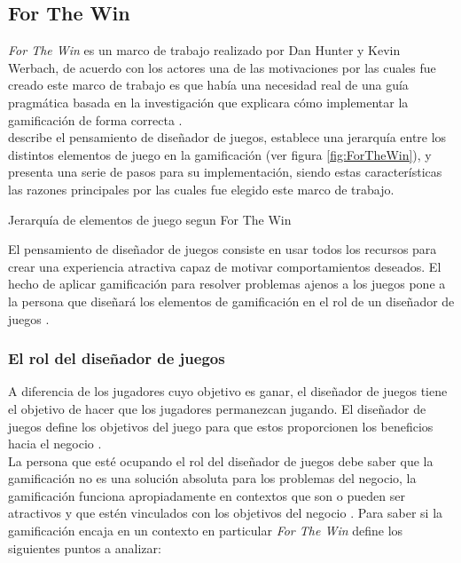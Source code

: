 \subsection{For The Win} \label{sec:ForTheWin}

 {\em For The Win} es un marco de trabajo realizado por Dan Hunter y Kevin Werbach,
 de acuerdo con los actores una de las motivaciones por las cuales fue creado este
 marco de trabajo es que había una necesidad real de una guía pragmática basada en
 la investigación que explicara cómo implementar la gamificación de forma correcta
 \cite{ForTheWin}.\\

  describe el pensamiento de diseñador de juegos, establece una
 jerarquía entre los distintos elementos de juego en la gamificación (ver figura \ref{fig:ForTheWin}),
 y presenta una serie de pasos para su implementación, siendo estas características las razones
 principales por las cuales fue elegido este marco de trabajo.

        {Jerarquía de elementos de juego segun For The Win}

 \noindent El pensamiento de diseñador de juegos consiste en usar todos los recursos para
 crear una experiencia atractiva capaz de motivar comportamientos deseados. El hecho de
 aplicar gamificación para resolver problemas ajenos a los juegos pone a la persona que
 diseñará los elementos de gamificación en el rol de un diseñador de juegos \cite[p. 29]{ForTheWin}.


\subsubsection{El rol del diseñador de juegos}

 \noindent A diferencia de los jugadores cuyo objetivo es ganar, el diseñador de juegos
 tiene el objetivo de hacer que los jugadores permanezcan jugando. El diseñador de juegos
 define los objetivos del juego para que estos proporcionen los beneficios hacia el negocio
 \cite[p. 29]{ForTheWin}.\\

 \noindent La persona que esté ocupando el rol del diseñador de juegos debe saber que la
 gamificación no es una solución absoluta para los problemas del negocio, la gamificación
 funciona apropiadamente en contextos que son o pueden ser atractivos y que estén vinculados
 con los objetivos del negocio \cite[p. 30]{ForTheWin}. Para saber si la gamificación encaja
 en un contexto en particular {\em For The Win} define los siguientes puntos a analizar:

